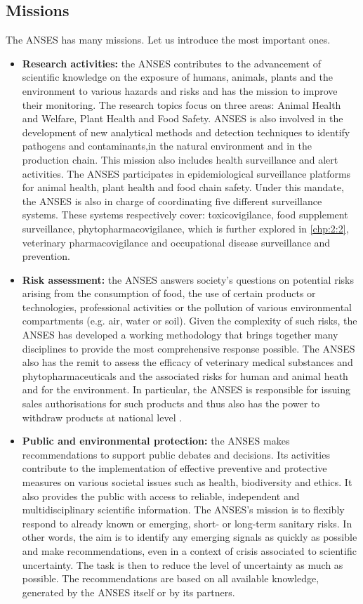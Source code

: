 \subsection{Missions} 

The ANSES has many missions. Let us introduce the most important ones.
\begin{itemize}
\item \textbf{Research activities:} the ANSES contributes to the advancement of scientific knowledge on the exposure of humans, animals, plants and the environment to various hazards and risks and has the mission to improve their monitoring. The research topics focus on three areas: Animal Health and Welfare, Plant Health and Food Safety. ANSES is also involved in the development of new analytical methods and detection techniques to identify pathogens and contaminants,in the natural environment and in the production chain. This mission also includes health surveillance and alert activities. The ANSES participates in epidemiological surveillance platforms for animal health, plant health and food chain safety. Under this mandate, the ANSES is also in charge of coordinating five different surveillance systems. These systems respectively cover: toxicovigilance, food supplement surveillance, phytopharmacovigilance, which is further explored in \ref{chp:2:2}, veterinary pharmacovigilance and occupational disease surveillance and prevention. 
\item \textbf{Risk assessment:} the ANSES answers society's questions on potential risks arising from the consumption of food, the use of certain products or technologies, professional activities or the pollution of various environmental compartments (e.g. air, water or soil). Given the complexity of such risks, the ANSES has developed a working methodology that brings together many disciplines to provide the most comprehensive response possible. The ANSES also has the remit to assess the efficacy of veterinary medical substances and phytopharmaceuticals and the associated risks for human and animal heath and for the environment. In particular, the ANSES is responsible for issuing sales authorisations for such products and thus also has the power to withdraw products at national level \citep{ansesdec}. 
\item \textbf{Public and environmental protection:} the ANSES makes recommendations to support public debates and decisions. Its activities contribute to the implementation of effective preventive and protective measures on various societal issues such as health, biodiversity and ethics. It also provides the public with access to reliable, independent and multidisciplinary scientific information. The ANSES's mission is to flexibly respond to already known or emerging, short- or long-term sanitary risks. In other words, the aim is to identify any emerging signals as quickly as possible and make recommendations, even in a context of crisis associated to scientific uncertainty. The task is then to reduce the level of uncertainty as much as possible. The recommendations are based on all available knowledge, generated by the ANSES itself or by its partners. 
\end{itemize}

